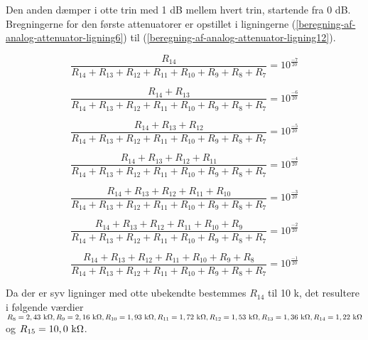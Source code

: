Den anden dæmper i otte trin med 1 dB mellem hvert trin, startende fra 0 dB. Bregningerne for den første attenuatorer er opstillet i ligningerne (\ref{beregning-af-analog-attenuator-ligning6}) til (\ref{beregning-af-analog-attenuator-ligning12}).

\begin{equation}
\label{beregning-af-analog-attenuator-ligning6}
\frac{R_{14}}{R_{14} + R_{13} + R_{12} + R_{11} + R_{10} + R_{9} + R_{8} + R_{7}} = 10^{\frac{-7}{20}}
\end{equation}

\begin{equation}
\frac{R_{14} + R_{13}}{R_{14} + R_{13} + R_{12} + R_{11} + R_{10} + R_{9} + R_{8} + R_{7}} = 10^{\frac{-6}{20}}
\end{equation}

\begin{equation}
\frac{R_{14} + R_{13} + R_{12}}{R_{14} + R_{13} + R_{12} + R_{11} + R_{10} + R_{9} + R_{8} + R_{7}} = 10^{\frac{-5}{20}}
\end{equation}

\begin{equation}
\frac{R_{14} + R_{13} + R_{12} + R_{11}}{R_{14} + R_{13} + R_{12} + R_{11} + R_{10} + R_{9} + R_{8} + R_{7}} = 10^{\frac{-4}{20}}
\end{equation}

\begin{equation}
\frac{R_{14} + R_{13} + R_{12} + R_{11} + R_{10}}{R_{14} + R_{13} + R_{12} + R_{11} + R_{10} + R_{9} + R_{8} + R_{7}} = 10^{\frac{-3}{20}}
\end{equation}

\begin{equation}
\frac{R_{14} + R_{13} + R_{12} + R_{11} + R_{10} + R_{9}}{R_{14} + R_{13} + R_{12} + R_{11} + R_{10} + R_{9} + R_{8} + R_{7}} = 10^{\frac{-2}{20}}
\end{equation}

\begin{equation}
\label{beregning-af-analog-attenuator-ligning12}
\frac{R_{14} + R_{13} + R_{12} + R_{11} + R_{10} + R_{9} + R_{8}}{R_{14} + R_{13} + R_{12} + R_{11} + R_{10} + R_{9} + R_{8} + R_{7}} = 10^{\frac{-1}{20}}
\end{equation}

Da der er syv ligninger med otte ubekendte bestemmes $R_{14}$ til 10 k\ohm, det resultere i følgende værdier 
$R_{8} = 2,43 ~\mathrm{k}\ohm, R_{9} = 2,16 ~\mathrm{k}\ohm, R_{10} = 1,93 ~\mathrm{k}\ohm, R_{11} = 1,72 ~\mathrm{k}\ohm, R_{12} = 1,53 ~\mathrm{k}\ohm, R_{13} = 1,36 ~\mathrm{k}\ohm, R_{14} = 1,22 ~\mathrm{k}\ohm$ og $R_{15} = 10,0 ~\mathrm{k}\ohm$.
